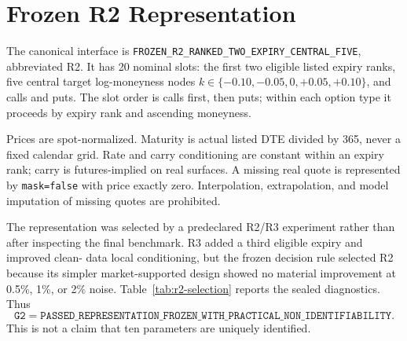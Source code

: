 \section{Frozen R2 Representation}
\label{sec:r2-representation}

The canonical interface is
\texttt{FROZEN\_R2\_RANKED\_TWO\_EXPIRY\_CENTRAL\_FIVE}, abbreviated R2. It has 20
nominal slots: the first two eligible listed expiry ranks, five central target
log-moneyness nodes $k\in\{-0.10,-0.05,0,+0.05,+0.10\}$, and calls and puts. The
slot order is calls first, then puts; within each option type it proceeds by expiry
rank and ascending moneyness.

Prices are spot-normalized. Maturity is actual listed DTE divided by 365, never a
fixed calendar grid. Rate and carry conditioning are constant within an expiry rank;
carry is futures-implied on real surfaces. A missing real quote is represented by
\texttt{mask=false} with price exactly zero. Interpolation, extrapolation, and model
imputation of missing quotes are prohibited.

The representation was selected by a predeclared R2/R3 experiment rather than after
inspecting the final benchmark. R3 added a third eligible expiry and improved clean-
data local conditioning, but the frozen decision rule selected R2 because its simpler
market-supported design showed no material improvement at 0.5\%, 1\%, or 2\% noise.
Table~\ref{tab:r2-selection} reports the sealed diagnostics. Thus
\begin{equation}
    \texttt{G2} =
    \texttt{PASSED\_REPRESENTATION\_FROZEN\_WITH\_PRACTICAL\_NON\_IDENTIFIABILITY}.
\end{equation}
This is not a claim that ten parameters are uniquely identified.


